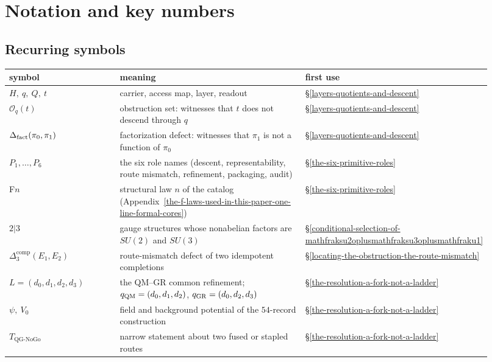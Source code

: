 \section{Notation and key numbers}\label{notation-the-six-primitives-at-a-glance}

\subsection{Recurring symbols}\label{recurring-symbols}

\begin{center}
\small
\begin{longtable}[]{@{}p{0.27\linewidth}p{0.55\linewidth}p{0.1\linewidth}@{}}
\toprule
symbol & meaning & first use\\
\midrule
\endhead
\(H,\ q,\ Q,\ t\) & carrier, access map, layer, readout & \S\ref{layers-quotients-and-descent}\\
\(\mathcal O_q(t)\) & obstruction set: witnesses that \(t\) does not descend through \(q\) & \S\ref{layers-quotients-and-descent}\\
\(\Delta_{\mathrm{fact}}(\pi_0,\pi_1)\) & factorization defect: witnesses that \(\pi_1\) is not a function of \(\pi_0\) & \S\ref{layers-quotients-and-descent}\\
\(P_1,\dots,P_6\) & the six role names (descent, representability, route mismatch, refinement, packaging, audit) & \S\ref{the-six-primitive-roles}\\
F\(n\) & structural law \(n\) of the catalog (Appendix~\ref{the-f-laws-used-in-this-paper-one-line-formal-cores}) & \S\ref{the-six-primitive-roles}\\
\(2|3\) & gauge structures whose nonabelian factors are \(SU(2)\) and \(SU(3)\) & \S\ref{conditional-selection-of-mathfraksu2oplusmathfraksu3oplusmathfraku1}\\
\(\Delta_3^{\mathrm{comp}}(E_1,E_2)\) & route-mismatch defect of two idempotent completions & \S\ref{locating-the-obstruction-the-route-mismatch}\\
\(L=(d_0,d_1,d_2,d_3)\) & the QM--GR common refinement; \(q_{\rm QM}=(d_0,d_1,d_2)\), \(q_{\rm GR}=(d_0,d_2,d_3)\) & \S\ref{the-resolution-a-fork-not-a-ladder}\\
\(\psi,\ V_0\) & field and background potential of the \(54\)-record construction & \S\ref{the-resolution-a-fork-not-a-ladder}\\
\(T_{\mathrm{QG\text{-}NoGo}}\) & narrow statement about two fused or stapled routes & \S\ref{the-resolution-a-fork-not-a-ladder}\\

\end{longtable}
\end{center}
